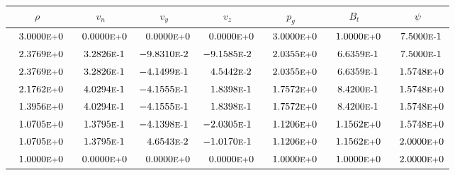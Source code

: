 \begin{tabular*}{\textwidth}{@{\extracolsep{\fill}} ccccccc}
\\ 
\hline 
\hline 
$\rho$ & $v_n$ & $v_y$ & $v_z$ & $p_g$ & $B_t$ & $\psi$ \\ 
\hline 
$\phantom{-} 3.0000\mbox{\sc{e}\smaller{+}}0$ & $\phantom{-} 0.0000\mbox{\sc{e}\smaller{+}}0$ & $\phantom{-} 0.0000\mbox{\sc{e}\smaller{+}}0$ & $\phantom{-} 0.0000\mbox{\sc{e}\smaller{+}}0$ & $\phantom{-} 3.0000\mbox{\sc{e}\smaller{+}}0$ & $\phantom{-} 1.0000\mbox{\sc{e}\smaller{+}}0$ & $\phantom{-} 7.5000\mbox{\sc{e}\smaller{-}}1$ \\ 
$\phantom{-} 2.3769\mbox{\sc{e}\smaller{+}}0$ & $\phantom{-} 3.2826\mbox{\sc{e}\smaller{-}}1$ & $-9.8310\mbox{\sc{e}\smaller{-}}2$ & $-9.1585\mbox{\sc{e}\smaller{-}}2$ & $\phantom{-} 2.0355\mbox{\sc{e}\smaller{+}}0$ & $\phantom{-} 6.6359\mbox{\sc{e}\smaller{-}}1$ & $\phantom{-} 7.5000\mbox{\sc{e}\smaller{-}}1$ \\ 
$\phantom{-} 2.3769\mbox{\sc{e}\smaller{+}}0$ & $\phantom{-} 3.2826\mbox{\sc{e}\smaller{-}}1$ & $-4.1499\mbox{\sc{e}\smaller{-}}1$ & $\phantom{-} 4.5442\mbox{\sc{e}\smaller{-}}2$ & $\phantom{-} 2.0355\mbox{\sc{e}\smaller{+}}0$ & $\phantom{-} 6.6359\mbox{\sc{e}\smaller{-}}1$ & $\phantom{-} 1.5748\mbox{\sc{e}\smaller{+}}0$ \\ 
$\phantom{-} 2.1762\mbox{\sc{e}\smaller{+}}0$ & $\phantom{-} 4.0294\mbox{\sc{e}\smaller{-}}1$ & $-4.1555\mbox{\sc{e}\smaller{-}}1$ & $\phantom{-} 1.8398\mbox{\sc{e}\smaller{-}}1$ & $\phantom{-} 1.7572\mbox{\sc{e}\smaller{+}}0$ & $\phantom{-} 8.4200\mbox{\sc{e}\smaller{-}}1$ & $\phantom{-} 1.5748\mbox{\sc{e}\smaller{+}}0$ \\ 
$\phantom{-} 1.3956\mbox{\sc{e}\smaller{+}}0$ & $\phantom{-} 4.0294\mbox{\sc{e}\smaller{-}}1$ & $-4.1555\mbox{\sc{e}\smaller{-}}1$ & $\phantom{-} 1.8398\mbox{\sc{e}\smaller{-}}1$ & $\phantom{-} 1.7572\mbox{\sc{e}\smaller{+}}0$ & $\phantom{-} 8.4200\mbox{\sc{e}\smaller{-}}1$ & $\phantom{-} 1.5748\mbox{\sc{e}\smaller{+}}0$ \\ 
$\phantom{-} 1.0705\mbox{\sc{e}\smaller{+}}0$ & $\phantom{-} 1.3795\mbox{\sc{e}\smaller{-}}1$ & $-4.1398\mbox{\sc{e}\smaller{-}}1$ & $-2.0305\mbox{\sc{e}\smaller{-}}1$ & $\phantom{-} 1.1206\mbox{\sc{e}\smaller{+}}0$ & $\phantom{-} 1.1562\mbox{\sc{e}\smaller{+}}0$ & $\phantom{-} 1.5748\mbox{\sc{e}\smaller{+}}0$ \\ 
$\phantom{-} 1.0705\mbox{\sc{e}\smaller{+}}0$ & $\phantom{-} 1.3795\mbox{\sc{e}\smaller{-}}1$ & $\phantom{-} 4.6543\mbox{\sc{e}\smaller{-}}2$ & $-1.0170\mbox{\sc{e}\smaller{-}}1$ & $\phantom{-} 1.1206\mbox{\sc{e}\smaller{+}}0$ & $\phantom{-} 1.1562\mbox{\sc{e}\smaller{+}}0$ & $\phantom{-} 2.0000\mbox{\sc{e}\smaller{+}}0$ \\ 
$\phantom{-} 1.0000\mbox{\sc{e}\smaller{+}}0$ & $\phantom{-} 0.0000\mbox{\sc{e}\smaller{+}}0$ & $\phantom{-} 0.0000\mbox{\sc{e}\smaller{+}}0$ & $\phantom{-} 0.0000\mbox{\sc{e}\smaller{+}}0$ & $\phantom{-} 1.0000\mbox{\sc{e}\smaller{+}}0$ & $\phantom{-} 1.0000\mbox{\sc{e}\smaller{+}}0$ & $\phantom{-} 2.0000\mbox{\sc{e}\smaller{+}}0$ \\ 
\hline 
\end{tabular*} 
